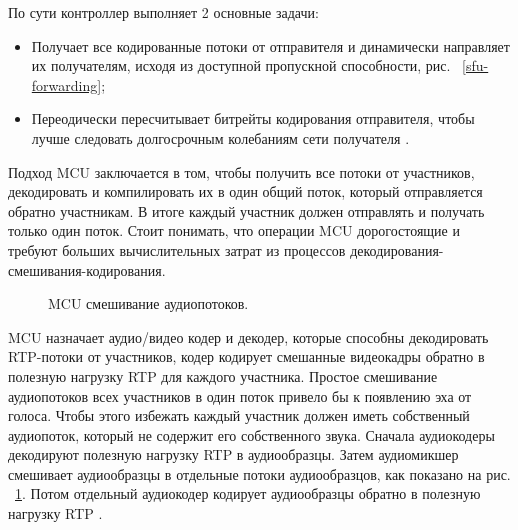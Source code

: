 По сути контроллер выполняет 2 основные задачи:
\begin{itemize}
	\item[1.] Получает все кодированные потоки от отправителя и динамически направляет их получателям, исходя из доступной пропускной способности, рис. ~\ref{sfu-forwarding};
	\item[2.] Переодически пересчитывает битрейты кодирования отправителя, чтобы лучше следовать долгосрочным колебаниям сети получателя \cite{v18}.
\end{itemize}


Подход MCU заключается в том, чтобы получить все потоки от участников, декодировать и компилировать их в один общий поток, который отправляется обратно участникам. В итоге каждый участник должен отправлять и получать только один поток. Стоит понимать, что операции MCU дорогостоящие и требуют больших вычислительных затрат из процессов декодирования-смешивания-кодирования.

\begin{figure}[ht]
\begin{center}

\caption{
\label{mcu}
     MCU смешивание аудиопотоков.}
\end {center}
\end {figure}

MCU назначает аудио/видео кодер и декодер, которые способны декодировать RTP-потоки от участников, кодер кодирует смешанные видеокадры обратно в полезную нагрузку RTP для каждого участника. Простое смешивание аудиопотоков всех участников в один поток привело бы к появлению эха от голоса. Чтобы этого избежать каждый участник должен иметь собственный аудиопоток, который не содержит его собственного звука. Сначала аудиокодеры декодируют полезную нагрузку RTP в аудиообразцы. Затем аудиомикшер смешивает аудиообразцы в отдельные потоки аудиообразцов, как показано на рис. ~\ref{mcu}. Потом отдельный аудиокодер кодирует аудиообразцы обратно в полезную нагрузку RTP \cite{v19}.

